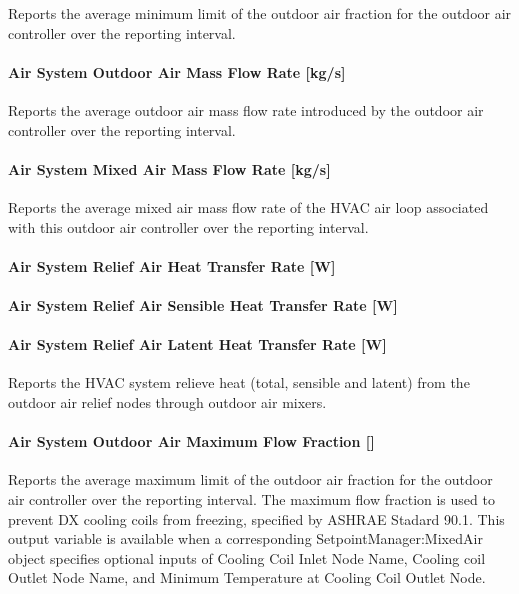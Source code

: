 Reports the average minimum limit of the outdoor air fraction for the outdoor air controller over the reporting interval.

\paragraph{Air System Outdoor Air Mass Flow Rate {[}kg/s{]}}\label{air-system-outdoor-air-mass-flow-rate-kgs}

Reports the average outdoor air mass flow rate introduced by the outdoor air controller over the reporting interval.

\paragraph{Air System Mixed Air Mass Flow Rate {[}kg/s{]}}\label{air-system-mixed-air-mass-flow-rate-kgs}

Reports the average mixed air mass flow rate of the HVAC air loop associated with this outdoor air controller over the reporting interval.

\paragraph{Air System Relief Air Heat Transfer Rate {[}W{]}}\label{air-system-relief-air-heat-transfer-rate-w}

\paragraph{Air System Relief Air Sensible Heat Transfer Rate {[}W{]}}\label{air-system-relief-air-sensible-heat-transfer-rate-w}

\paragraph{Air System Relief Air Latent Heat Transfer Rate {[}W{]}}\label{air-system-relief-air-latent-heat-transfer-rate-w}

Reports the HVAC system relieve heat (total, sensible and latent) from the outdoor air relief nodes through outdoor air mixers.

\paragraph{Air System Outdoor Air Maximum Flow Fraction {[]}}\label{air-system-outdoor-air-maximum-flow-fraction}

Reports the average maximum limit of the outdoor air fraction for the outdoor air controller over the reporting interval. The maximum flow fraction is used to prevent DX cooling coils from freezing, specified by ASHRAE Stadard 90.1. This output variable is available when a corresponding SetpointManager:MixedAir object specifies optional inputs of Cooling Coil Inlet Node Name, Cooling coil Outlet Node Name, and Minimum Temperature at Cooling Coil Outlet Node.

